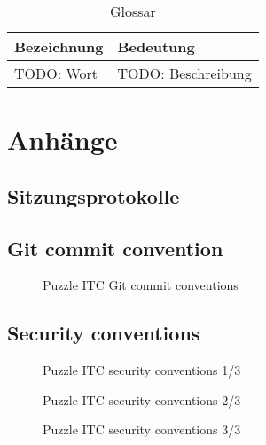 \begin{table}[H]
    \begin{tabular}{|L{0.3\textwidth}|L{0.6\textwidth}|}
        \hline
         \textbf{\color{white}Bezeichnung} & \textbf{\color{white}Bedeutung} \\[12pt]
        \hline
        TODO: Wort & TODO: Beschreibung \\
        \hline
    \end{tabular}
    \caption{Glossar}
\end{table}

\chapter{Anhänge}

\section{Sitzungsprotokolle}

\section{Git commit convention}
\label{sec:gitconv}
\begin{figure}[h]
    \centering
    \caption{Puzzle ITC Git commit conventions}
    \end{figure}

\section{Security conventions}
\label{sec:secconv}
\begin{figure}[h]
    \centering
    \caption{Puzzle ITC security conventions 1/3}
    \end{figure}
\begin{figure}[h]
    \centering
    \caption{Puzzle ITC security conventions 2/3 }
    \end{figure}  
\begin{figure}[h]
    \centering
    \caption{Puzzle ITC security conventions 3/3}
    \end{figure}  








